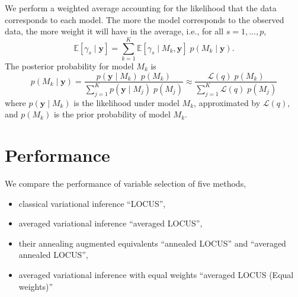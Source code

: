 \documentclass[portrait, a0, 30pt]{sciposter}
\begin{document}
\begin{multicols*}{2}
We perform a weighted average accounting for the likelihood that the data corresponds to each model. The more the model corresponds to the observed data, the more weight it will have in the average, i.e., for all $s = 1,\dots,p$, 
\begin{equation*}
\mathbb{E}\left[\gamma_s\mid \boldsymbol{y}\right] = \sum_{k=1}^K\mathbb{E}\left[\gamma_s\mid M_k, \boldsymbol{y}\right]\;p(M_k\mid \boldsymbol{y}).
\end{equation*}
The posterior probability for model $M_k$ is 
\begin{equation*}
p(M_k\mid \boldsymbol{y}) = \frac{p(\boldsymbol{y}\mid M_k)\;p(M_k)}{\sum_{j=1}^K p(\boldsymbol{y}\mid M_j)\; p(M_j)} \approx \frac{\mathcal{L}(q)\; p(M_k)}{\sum_{j=1}^K \mathcal{L}(q)\; p(M_j)}
\end{equation*}
where $p(\boldsymbol{y}\mid M_k)$ is the likelihood under model $M_k$, approximated by $\mathcal{L}(q)$, and $p(M_k)$ is the prior probability of model $M_k$.
\section{Performance}
We compare the performance of variable selection of five methods,
\begin{itemize}
\item classical variational inference ``LOCUS'',
\item averaged variational inference ``averaged LOCUS'',
\item their annealing augmented equivalents ``annealed LOCUS'' and ``averaged annealed LOCUS'',
\item averaged variational inference with equal weights ``averaged LOCUS (Equal weights)''
\end{itemize}


\end{multicols*}
\end{document}
